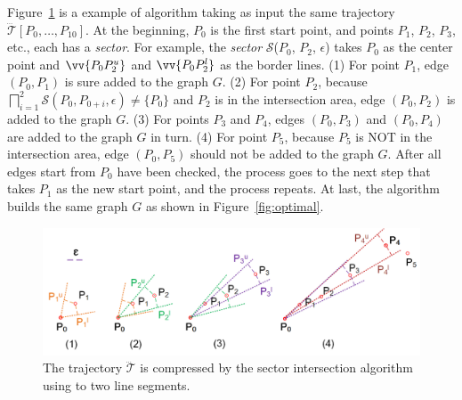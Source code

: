\begin{example}
	\label{exm-alg-optped}
	Figure~\ref{fig:optped} is a example of algorithm {\optp} taking as input the same trajectory $\dddot{\mathcal{T}}[P_0, \ldots, P_{10}]$. At the beginning, $P_0$ is the first start point, and points $P_1$, $P_2$, $P_3$, etc., each has a \emph{sector}. For example, the \emph{sector} $\mathcal{S}$($P_0$, $P_{2}$, $\epsilon$) takes $P_0$ as the center point and $\vv{P_0P^u_{2}}$ and $\vv{P_0P^l_{2}}$ as the border lines.
	(1) For point $P_1$, edge $(P_0, P_1)$ is sure added to the graph $G$.
	(2) For point $P_2$, because $\bigsqcap_{i=1}^{2}\mathcal{S}(P_0, P_{0+i}, \epsilon) \ne \{P_0\}$ and $P_2$ is in the intersection area, edge $(P_0, P_2)$ is added to the graph $G$.
	(3) For points $P_3$ and $P_4$, edges $(P_0, P_3)$ and $(P_0, P_4)$ are added to the graph $G$ in turn.
	(4) For point $P_5$, because $P_5$ is NOT in the intersection area, edge $(P_0, P_5)$ should not be added to the graph $G$.
	After all edges start from $P_0$ have been checked, the process goes to the next step that takes $P_1$ as the new start point, and the process repeats. At last, the algorithm builds the same graph $G$ as shown in Figure~\ref{fig:optimal}.
\end{example}

\begin{figure}[tb!]
	\centering
	\hspace{-1ex}\includegraphics[scale=0.66]{Figures/Fig-OptPed.png}\vspace{-3ex}
	\caption{\small The trajectory $\dddot{\mathcal{T}}$ is compressed by the sector intersection algorithm using \ped to two line segments.}	\vspace{-2ex}
	\label{fig:optped}
\end{figure}

